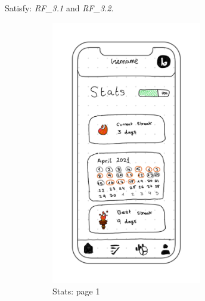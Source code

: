 Satisfy: \textit{RF\_3.1} and \textit{RF\_3.2}. \\
\begin{figure}[H]
    \centering
    \begin{subfigure}[T]{0.32\textwidth}
        \centering
        \includegraphics[width=0.72\textwidth]{assets/screens/stats/Stats - 1.png}
        \caption{Stats: page 1}
        \label{fig:design_screen_stats_1}
    \end{subfigure}
    \hfill
    \begin{subfigure}[T]{0.32\textwidth}
        \centering

\end{subfigure}
\end{figure}

